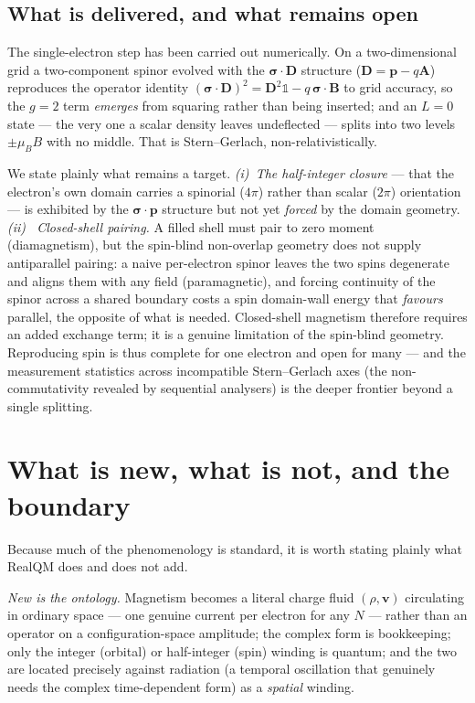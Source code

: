 \documentclass[11pt]{article}
\begin{document}
\subsection{What is delivered, and what remains open}

The single-electron step has been carried out numerically. On a two-dimensional grid a two-component spinor
evolved with the $\boldsymbol\sigma\!\cdot\!\mathbf D$ structure ($\mathbf D=\mathbf p-q\mathbf A$) reproduces the
operator identity $(\boldsymbol\sigma\!\cdot\!\mathbf D)^2=\mathbf D^2\mathbb 1-q\,\boldsymbol\sigma\!\cdot\!
\mathbf B$ to grid accuracy, so the $g=2$ term \emph{emerges} from squaring rather than being inserted; and an
$L=0$ state --- the very one a scalar density leaves undeflected --- splits into two levels $\pm\mu_B B$ with no
middle. That is Stern--Gerlach, non-relativistically.

We state plainly what remains a target. \emph{(i)~The half-integer closure} --- that the electron's own domain
carries a spinorial ($4\pi$) rather than scalar ($2\pi$) orientation --- is exhibited by the
$\boldsymbol\sigma\!\cdot\!\mathbf p$ structure but not yet \emph{forced} by the domain geometry. \emph{(ii)~
Closed-shell pairing.} A filled shell must pair to zero moment (diamagnetism), but the spin-blind non-overlap
geometry does not supply antiparallel pairing: a naive per-electron spinor leaves the two spins degenerate and
aligns them with any field (paramagnetic), and forcing continuity of the spinor across a shared boundary costs a
spin domain-wall energy that \emph{favours} parallel, the opposite of what is needed. Closed-shell magnetism
therefore requires an added exchange term; it is a genuine limitation of the spin-blind geometry. Reproducing spin
is thus complete for one electron and open for many --- and the measurement statistics across incompatible
Stern--Gerlach axes (the non-commutativity revealed by sequential analysers) is the deeper frontier beyond a
single splitting.

\section{What is new, what is not, and the boundary}
\label{sec:ledger}

Because much of the phenomenology is standard, it is worth stating plainly what RealQM does and does not add.

\emph{New is the ontology.} Magnetism becomes a literal charge fluid $(\rho,\mathbf v)$ circulating in ordinary
space --- one genuine current per electron for any $N$ --- rather than an operator on a configuration-space
amplitude; the complex form is bookkeeping; only the integer (orbital) or half-integer (spin) winding is quantum;
and the two are located precisely against radiation (a temporal oscillation that genuinely needs the complex
time-dependent form) as a \emph{spatial} winding.
\end{document}
